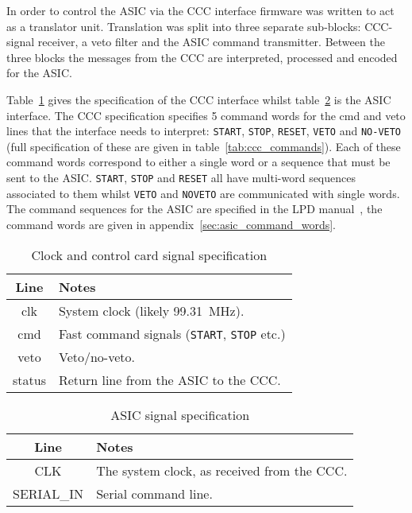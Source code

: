 \documentclass[]{report}
\begin{document}
    In order to control the ASIC via the CCC interface firmware was written to act as a translator unit. Translation was split into three separate sub-blocks: CCC-signal receiver, a veto filter and the ASIC command transmitter. Between the three blocks the messages from the CCC are interpreted, processed and encoded for the ASIC. 
    
    Table~\ref{tab:ccc_spec} gives the specification of the CCC interface whilst table~\ref{tab:asic_spec} is the ASIC interface. The CCC specification specifies 5 command words for the cmd and veto lines that the interface needs to interpret: \texttt{START}, \texttt{STOP}, \texttt{RESET}, \texttt{VETO} and \texttt{NO-VETO} (full specification of these are given in table~\ref{tab:ccc_commands}). Each of these command words correspond to either a single word or a sequence that must be sent to the ASIC. \texttt{START}, \texttt{STOP} and \texttt{RESET} all have multi-word sequences associated to them whilst \texttt{VETO} and \texttt{NOVETO} are communicated with single words. The command sequences for the ASIC are specified in the LPD manual~\cite{LPD MANUAL}, the command words are given in appendix~\ref{sec:asic_command_words}.
    
    \begin{table}
        \begin{center}
            \begin{tabular}{c|l}
                Line & Notes \\
                \hline
                clk    & System clock (likely 99.31~MHz).        \\
                cmd    & Fast command signals (\texttt{START}, \texttt{STOP} etc.) \\
                veto   & Veto/no-veto.                                             \\
                status & Return line from the ASIC to the CCC.                     \\
            \end{tabular}
        \end{center}
        \caption{Clock and control card signal specification}
        \label{tab:ccc_spec}
    \end{table}

    \begin{table}
        \begin{center}
            \begin{tabular}{c|l}
                Line       & Notes                                       \\
                \hline
                CLK        & The system clock, as received from the CCC. \\
                SERIAL\_IN & Serial command line.                        \\
            \end{tabular}
        \end{center}
        \caption{ASIC signal specification}
        \label{tab:asic_spec}
    \end{table}
  
\end{document}
